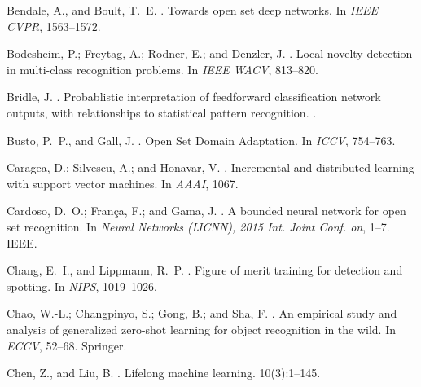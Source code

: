 \documentclass[letterpaper]{article}
\begin{document}
\begin{thebibliography}{}
Bendale, A., and Boult, T.~E.
.
\newblock Towards open set deep networks.
\newblock In {\em IEEE CVPR},  1563--1572.

Bodesheim, P.; Freytag, A.; Rodner, E.; and Denzler, J.
.
\newblock Local novelty detection in multi-class recognition problems.
\newblock In {\em IEEE WACV},  813--820.

Bridle, J.
.
\newblock Probablistic interpretation of feedforward classification network
  outputs, with relationships to statistical pattern recognition.
.

Busto, P.~P., and Gall, J.
.
\newblock Open {Set} {Domain} {Adaptation}.
\newblock In {\em {ICCV}},  754--763.

Caragea, D.; Silvescu, A.; and Honavar, V.
.
\newblock Incremental and distributed learning with support vector machines.
\newblock In {\em AAAI},  1067.

Cardoso, D.~O.; França, F.; and Gama, J.
.
\newblock A bounded neural network for open set recognition.
\newblock In {\em Neural {Networks} ({IJCNN}), 2015 {Int.} {Joint} {Conf.} on},
   1--7.
\newblock IEEE.

Chang, E.~I., and Lippmann, R.~P.
.
\newblock Figure of merit training for detection and spotting.
\newblock In {\em NIPS},  1019--1026.

Chao, W.-L.; Changpinyo, S.; Gong, B.; and Sha, F.
.
\newblock An empirical study and analysis of generalized zero-shot learning for
  object recognition in the wild.
\newblock In {\em ECCV},  52--68.
\newblock Springer.

Chen, Z., and Liu, B.
.
\newblock Lifelong machine learning.
 10(3):1--145.


\end{thebibliography}
\end{document}
